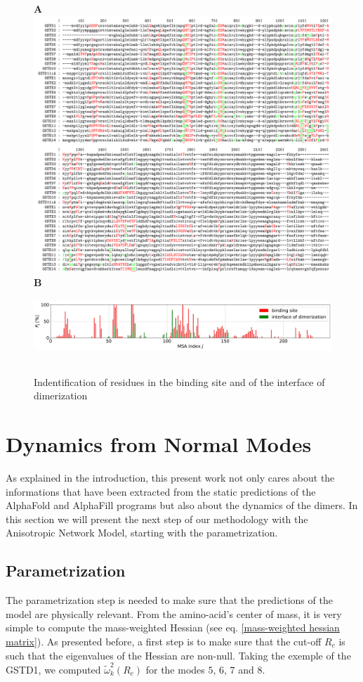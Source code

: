 \begin{figure}
	\label{MSA + AF + AFi}
	\raggedright\textbf{A}\\
	\center\includegraphics[width = .80\linewidth]{figures/MSA_matrix.pdf}\\[.5cm] %
	\textbf{B}\\
	\center\includegraphics[height = 2.75cm]{figures/MSA_Proba.jpg} %
	\caption{Indentification of residues in the binding site and of the interface of dimerization}
\end{figure}

\newpage
\section{Dynamics from Normal Modes}
\noindent As explained in the introduction, this present work not only cares about the informations that have been extracted from the static predictions of the AlphaFold and AlphaFill programs but also about the dynamics of the dimers. In this section we will present the next step of our methodology with the Anisotropic Network Model, starting with the parametrization.

\subsection{Parametrization}
\noindent The parametrization step is needed to make sure that the predictions of the model are physically relevant. From the amino-acid's center of mass, it is very simple to compute the mass-weighted Hessian (see eq. \ref{mass-weighted hessian matrix}). As presented before, a first step is to make sure that the cut-off $R_c$ is such that the eigenvalues of the Hessian are non-null. Taking the exemple of the GSTD1, we computed $\tilde{\omega}_k^2 (R_c)$ for the modes $5$, $6$, $7$ and $8$. 

